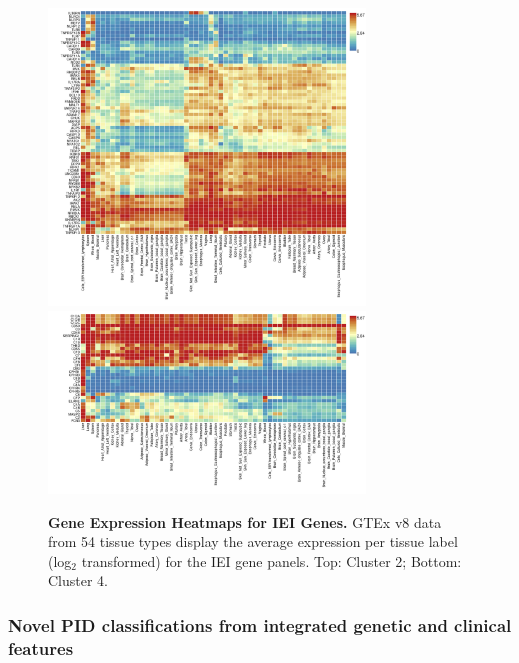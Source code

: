 \begin{figure}[h]
\centering
\includegraphics[width=0.75\textwidth]{../images/expHeat_FUMA_jobs604419_var_risk_est_cluster_2.png}
\includegraphics[width=0.75\textwidth]{../images/expHeat_FUMA_jobs604403_var_risk_est_cluster_4.png}
\caption{\textbf{Gene Expression Heatmaps for IEI Genes.} GTEx v8 data from 54 tissue types display the average expression per tissue label (log\(_2\) transformed) for the IEI gene panels. Top: Cluster 2; Bottom: Cluster 4.}
\label{fig:expHeatmaps}
\end{figure}

\FloatBarrier
\clearpage

\subsubsection{Novel PID classifications from integrated genetic and clinical features}

